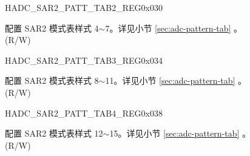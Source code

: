 \begin{register}{H}{ADC\_SAR2\_PATT\_TAB2\_REG}{0x030}\label{regdesc:ADCSAR2PATTTAB2REG}
%
%
\regnewline%
\begin{regdesc}\begin{reglist}
\label{fielddesc:ADCSAR2PATTTAB2}\item [ADC\_SAR2\_PATT\_TAB2] 配置 SAR2 模式表样式 4$\sim$7。详见小节 \ref{sec:adc-pattern-tab} \textit{}。\\
(R/W)
\end{reglist}\end{regdesc}
\end{register}


\begin{register}{H}{ADC\_SAR2\_PATT\_TAB3\_REG}{0x034}\label{regdesc:ADCSAR2PATTTAB3REG}
%
%
\regnewline%
\begin{regdesc}\begin{reglist}
\label{fielddesc:ADCSAR2PATTTAB3}\item [ADC\_SAR2\_PATT\_TAB3] 配置 SAR2 模式表样式 8$\sim$11。详见小节 \ref{sec:adc-pattern-tab} \textit{}。\\
(R/W)
\end{reglist}\end{regdesc}
\end{register}


\begin{register}{H}{ADC\_SAR2\_PATT\_TAB4\_REG}{0x038}\label{regdesc:ADCSAR2PATTTAB4REG}
%
%
\regnewline%
\begin{regdesc}\begin{reglist}
\label{fielddesc:ADCSAR2PATTTAB4}\item [ADC\_SAR2\_PATT\_TAB4] 配置 SAR2 模式表样式 12$\sim$15。详见小节 \ref{sec:adc-pattern-tab} \textit{}。\\
(R/W)
\end{reglist}\end{regdesc}
\end{register}


